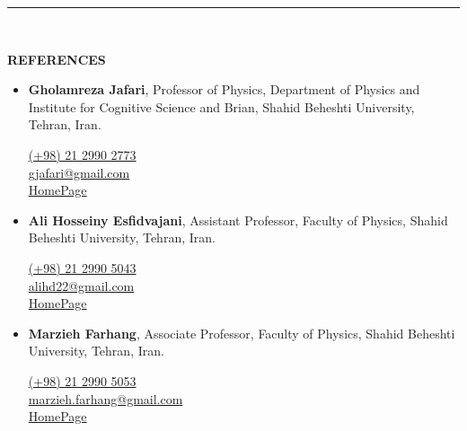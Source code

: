 \documentclass[11pt, b4paper]{cv}
\begin{document}
\vspace{-0.15in}
\rule{\textwidth}{1pt}\\
\vspace{-0.15in}

\textbf{REFERENCES}
\vspace{-0.1in}

\begin{itemize}
	\item \textbf{Gholamreza Jafari}, Professor of Physics, Department of Physics and Institute for Cognitive Science and Brian, Shahid Beheshti University, Tehran, Iran.
	
	\href{tel:(+98)2129902773}{ (+98) 21 2990 2773}\\
	\href{mailto:gjafari@gmail.com}{ gjafari@gmail.com}\\
	\href{https://complexity.sbu.ac.ir/professor-reza-jafari/}{HomePage} 
	\item \textbf{Ali Hosseiny Esfidvajani}, Assistant Professor, Faculty of Physics, Shahid Beheshti University, Tehran, Iran.
	
	\href{tel:(+98)2129905043}{ (+98) 21 2990 5043}\\
	\href{mailto:alihd22@gmail.com}{ alihd22@gmail.com}\\
	\href{https://alihosseiny.com/}{HomePage} 
		
	\item \textbf{Marzieh Farhang}, Associate Professor, Faculty of Physics, Shahid Beheshti University, Tehran, Iran.
	
	\href{tel:(+98)2129905053}{ (+98) 21 2990 5053}\\
	\href{mailto:marzieh.farhang@gmail.com}{ marzieh.farhang@gmail.com}\\
	\href{https://en.sbu.ac.ir/~m_farhang/home}{HomePage} 
\end{itemize}
\end{document}
